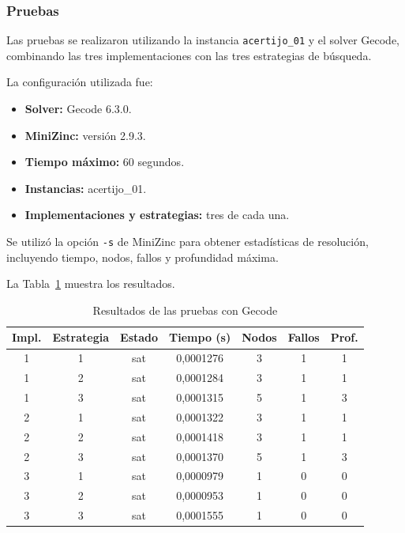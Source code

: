 \subsubsection{Pruebas}

Las pruebas se realizaron utilizando la instancia \texttt{acertijo\_01} y el solver Gecode, combinando las tres implementaciones con las tres estrategias de búsqueda.

La configuración utilizada fue:

\begin{itemize}
    \item \textbf{Solver:} Gecode 6.3.0.
    \item \textbf{MiniZinc:} versión 2.9.3.
    \item \textbf{Tiempo máximo:} 60 segundos.
    \item \textbf{Instancias:} acertijo\_01.
    \item \textbf{Implementaciones y estrategias:} tres de cada una.
\end{itemize}

Se utilizó la opción \texttt{-s} de MiniZinc para obtener estadísticas de resolución, incluyendo tiempo, nodos, fallos y profundidad máxima.

La Tabla~\ref{tab:acertijo-resultados} muestra los resultados.

\begin{table}[htbp]
\small
\caption{Resultados de las pruebas con Gecode}
\label{tab:acertijo-resultados}
\begin{tabular}{@{}ccccccc@{}}
\toprule
\textbf{Impl.} & \textbf{Estrategia} & \textbf{Estado} & \textbf{Tiempo (s)} & \textbf{Nodos} & \textbf{Fallos} & \textbf{Prof.} \\
\midrule
1 & 1 & sat & 0,0001276 & 3 & 1 & 1 \\
1 & 2 & sat & 0,0001284 & 3 & 1 & 1 \\
1 & 3 & sat & 0,0001315 & 5 & 1 & 3 \\
2 & 1 & sat & 0,0001322 & 3 & 1 & 1 \\
2 & 2 & sat & 0,0001418 & 3 & 1 & 1 \\
2 & 3 & sat & 0,0001370 & 5 & 1 & 3 \\
3 & 1 & sat & 0,0000979 & 1 & 0 & 0 \\
3 & 2 & sat & 0,0000953 & 1 & 0 & 0 \\
3 & 3 & sat & 0,0001555 & 1 & 0 & 0 \\
\bottomrule
\end{tabular}
\end{table}

